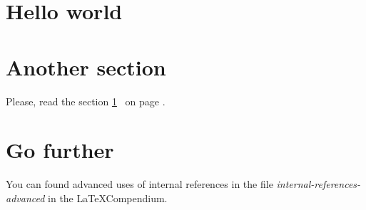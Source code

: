 \documentclass{article}
\begin{document}
\section{Hello world}
\label{lipsum}
\lipsum[1]

\section{Another section}

Please, read the section \ref{lipsum}\  on page \pageref{lipsum}.

\section{Go further}

You can found advanced uses of internal references in the file \emph{internal-references-advanced} in the \LaTeX Compendium.
\end{document}
